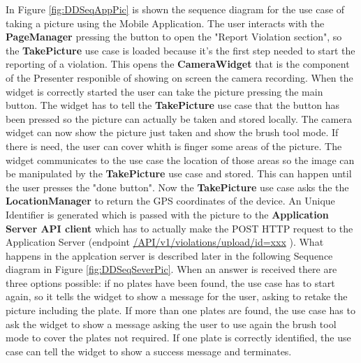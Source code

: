 In Figure \ref{fig:DDSeqAppPic} is shown the sequence diagram for the use case of taking a picture using the Mobile Application.
The user interacts with the \textbf{PageManager} pressing the button to open the "Report Violation section", so the \textbf{TakePicture} use case is loaded because it's the first step needed to start the reporting of a violation. This opens the \textbf{CameraWidget} that is the component of the Presenter responible of showing on screen the camera recording. When the widget is correctly started the user can take the picture pressing the main button. The widget has to tell the \textbf{TakePicture} use case that the button has been pressed so the picture can  actually be taken and stored locally. The camera widget can now show the picture just taken and show the brush tool mode. If there is need, the user can cover whith is finger some areas of the picture. The widget communicates to the use case the location of those areas so the image can be manipulated by the \textbf{TakePicture} use case and stored. This can happen until the user presses the "done button". Now the \textbf{TakePicture} use case asks the the \textbf{LocationManager} to return the GPS coordinates of the device. An Unique Identifier is generated which is passed with the picture to the \textbf{Application Server API client} which has to actually make the POST HTTP request to the Application Server (endpoint \url{/API/v1/violations/upload/id=xxx} ). What happens in the applcation server is described later in the following Sequence diagram in Figure \ref{fig:DDSeqSeverPic}.
When an answer is received there are three options possible: if no plates have been found, the use case has to start again, so it tells the widget to show a message for the user, asking to retake the picture including the plate.
If more than one plates are found, the use case has to ask the widget to show a message asking the user to use again the brush tool mode to cover the plates not required. If one plate is correctly identified, the use case can tell the widget to show a success message and terminates. %

